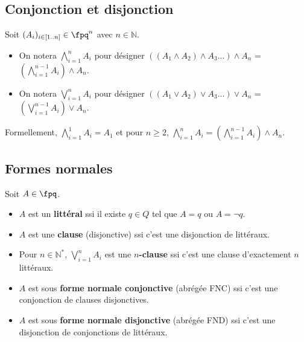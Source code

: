 \documentclass{scrartcl}
\begin{document}
		\subsection{Conjonction et disjonction}
			Soit $(A_i)_{i\in [1..n]} \in \fpq^n$ avec $n\in\mathbb{N}$.
			\begin{itemize}
				\item On notera $\bigwedge\limits_{i=1}^n A_i$ pour désigner $((A_1\wedge A_2) \wedge A_3 ...) \wedge A_n$ = $(\bigwedge_{i=1}^{n-1} A_i) \wedge A_n$.
				\item On notera $\bigvee\limits_{i=1}^n A_i$ pour désigner $((A_1\vee A_2) \vee A_3 ...) \vee A_n$ = $(\bigvee_{i=1}^{n-1} A_i) \vee A_n$.
			\end{itemize}
			Formellement, $\bigwedge\limits_{i=1}^{1}A_i = A_1$ et pour $n \geq 2$, $\bigwedge\limits_{i=1}^n A_i = (\bigwedge_{i=1}^{n-1} A_i) \wedge A_n$. 



		\subsection{Formes normales}
			Soit $A \in \fpq$.

			\begin{itemize}
				\item $A$ est un \textbf{littéral} ssi il existe $q \in Q$ tel que $A = q$ ou $A = \neg q$.
				\item $A$ est une \textbf{clause} (disjonctive) ssi c'est une disjonction de littéraux.
				\item Pour $n \in \mathbb{N}^*$, $\bigvee_{i=1}^n A_i$ est une \textbf{$n$-clause} ssi c'est une clause d'exactement $n$ littéraux.
				\item $A$ est sous \textbf{forme normale conjonctive} (abrégée FNC) ssi c'est une conjonction de clauses disjonctives.
				\item $A$ est sous \textbf{forme normale disjonctive} (abrégée FND) ssi c'est une disjonction de conjonctions de littéraux.
			\end{itemize}

\end{document}
